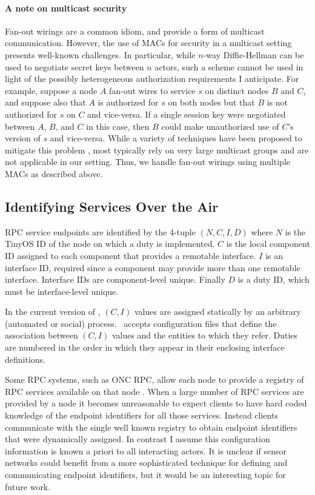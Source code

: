 \paragraph{A note on multicast security} Fan-out wirings are a common idiom, and provide a form
of multicast communication. However, the use of MACs for security in a multicast setting
presents well-known challenges. In particular, while $n$-way Diffie-Hellman can be used to
negotiate secret keys between $n$ actors, such a scheme cannot be used in light of the possibly
heterogeneous authorization requirements I anticipate. For example, suppose a node $A$ fan-out
wires to service $s$ on distinct nodes $B$ and $C$, and suppose also that $A$ is authorized for
$s$ on both nodes but that $B$ is not authorized for $s$ on $C$ and vice-versa. If a single
session key were negotiated between $A$, $B$, and $C$ in this case, then $B$ could make
unauthorized use of $C$'s version of $s$ and vice-versa. While a variety of techniques have been
proposed to mitigate this problem \cite{canetti-1999}, most typically rely on very large
multicast groups and are not applicable in our setting. Thus, we handle fan-out wirings using
multiple MACs as described above.

\subsection{Identifying Services Over the Air}

RPC service endpoints are identified by the 4-tuple $(N, C, I, D)$ where $N$ is the TinyOS ID of
the node on which a duty is implemented. $C$ is the local component ID assigned to each
component that provides a remotable interface. $I$ is an interface ID, required since a
component may provide more than one remotable interface. Interface IDs are component-level
unique. Finally $D$ is a duty ID, which must be interface-level unique.

In the current version of \Sprocket, $(C, I)$ values are assigned statically by an arbitrary
(automated or social) process. \Sprocket\ accepts configuration files that define the
association between $(C, I)$ values and the entities to which they refer. Duties are numbered in
the order in which they appear in their enclosing interface definitions.

Some RPC systems, such as ONC RPC, allow each node to provide a registry of RPC services
available on that node \cite{RFC-1833}. When a large number of RPC services are provided by a
node it becomes unreasonable to expect clients to have hard coded knowledge of the endpoint
identifiers for all those services. Instead clients communicate with the single well known
registry to obtain endpoint identifiers that were dynamically assigned. In contrast I assume
this configuration information is known a priori to all interacting actors. It is unclear if
sensor networks could benefit from a more sophisticated technique for defining and communicating
endpoint identifiers, but it would be an interesting topic for future work.

